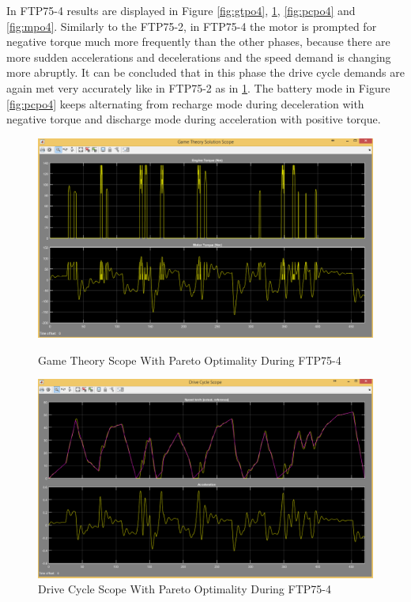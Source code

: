 In FTP75-4 results are displayed in Figure \ref{fig:gtpo4}, \ref{fig:dcpo4}, \ref{fig:pcpo4} and \ref{fig:mpo4}. Similarly to the FTP75-2, in FTP75-4 the motor is prompted for negative torque much more frequently than the other phases, because there are more sudden accelerations and decelerations and the speed demand is changing more abruptly. It can be concluded that in this phase the drive cycle demands are again met very accurately like in FTP75-2 as in \ref{fig:dcpo4}. The battery mode in Figure \ref{fig:pcpo4} keeps alternating from recharge mode during deceleration with negative torque and discharge mode during acceleration with positive torque.

\begin{figure}[hp]
\centering
\includegraphics[scale=0.46]{figures/Pareto/FTP75-4/gameTheory05Juli}
\caption{Game Theory Scope With Pareto Optimality During FTP75-4}
\label{fig:gtpo4}
\includegraphics[scale=0.44]{figures/Pareto/FTP75-4/driveCycle05Juli}
\caption{Drive Cycle Scope With Pareto Optimality During FTP75-4}
\label{fig:dcpo4}
\end{figure}

